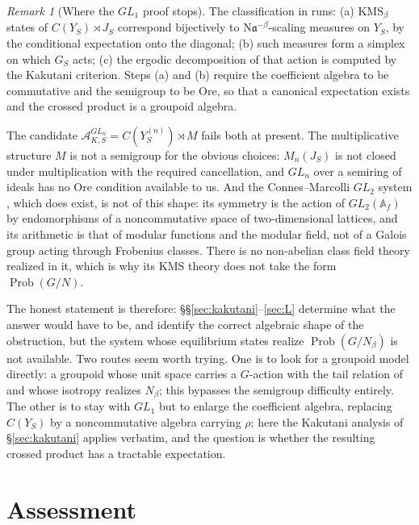 \documentclass[11pt]{amsart}
\numberwithin{equation}{section}
\theoremstyle{definition}
\theoremstyle{remark}
\newtheorem{remark}[theorem]{Remark}
\newcommand{\cA}{\mathcal{A}}
\newcommand{\aaa}{\mathfrak{a}}
\newcommand{\Ns}{\mathrm{N}}
\newcommand{\Prob}{\operatorname{Prob}}
\begin{document}
\begin{remark}[Where the $GL_1$ proof stops]\label{rem:gap}
The classification in \cite{Main} runs: (a) $\mathrm{KMS}_\beta$ states of
$C(Y_S)\rtimes J_S$ correspond bijectively to $\Ns\aaa^{-\beta}$-scaling measures on $Y_S$,
by the conditional expectation onto the diagonal; (b) such measures form a simplex on which
$G_S$ acts; (c) the ergodic decomposition of that action is computed by the Kakutani
criterion. Steps (a) and (b) require the coefficient algebra to be commutative and the
semigroup to be Ore, so that a canonical expectation exists and the crossed product is a
groupoid algebra.

The candidate $\cA^{GL_n}_{K,S}=C(Y^{(n)}_S)\rtimes M$ fails both at present. The
multiplicative structure $M$ is not a semigroup for the obvious choices: $M_n(J_S)$ is not
closed under multiplication with the required cancellation, and $GL_n$ over a semiring of
ideals has no Ore condition available to us. And the Connes--Marcolli $GL_2$ system \cite{CM}, which
does exist, is not of this shape: its symmetry is the action of $GL_2(\mathbb A_f)$ by
endomorphisms of a noncommutative space of two-dimensional lattices, and its arithmetic is
that of modular functions and the modular field, not of a Galois group acting through
Frobenius classes. There is no non-abelian class field theory realized in it, which is why
its $\mathrm{KMS}$ theory does not take the form $\Prob(G/N)$.

The honest statement is therefore: \S\S\ref{sec:kakutani}--\ref{sec:L} determine what the
answer would have to be, and identify the correct algebraic shape of the obstruction, but the
system whose equilibrium states realize $\Prob(G/N_\beta)$ is not available. Two routes seem
worth trying. One is to look for a groupoid model directly: a groupoid whose unit space
carries a $G$-action with the tail relation of \cite{Main} and whose isotropy realizes
$N_\beta$; this bypasses the semigroup difficulty entirely. The other is to stay with $GL_1$
but to enlarge the coefficient algebra, replacing $C(Y_S)$ by a noncommutative algebra
carrying $\rho$; here the Kakutani analysis of \S\ref{sec:kakutani} applies verbatim, and the
question is whether the resulting crossed product has a tractable expectation.
\end{remark}

\section{Assessment}
\end{document}
